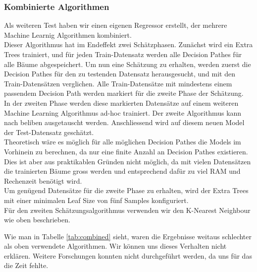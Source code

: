 \subsubsection{Kombinierte Algorithmen}
Als weiteren Test haben wir einen eigenen Regressor erstellt, der mehrere Machine Learnig Algorithmen kombiniert.\\[2ex]
%
Dieser Algorithmus hat im Endeffekt zwei Schätzphasen. Zunächst wird ein Extra Trees trainiert, und für jeden Train-Datensatz werden alle Decision Pathes für alle Bäume abgespeichert. Um nun eine Schätzung zu erhalten, werden zuerst die Decision Pathes für den zu testenden Datensatz herausgesucht, und mit den Train-Datensätzen verglichen. Alle Train-Datensätze mit mindestens einem passendem Decision Path werden markiert für die zweite Phase der Schätzung.\\
In der zweiten Phase werden diese markierten Datensätze auf einem weiteren Machine Learning Algorithmus ad-hoc trainiert. Der zweite Algorithmus kann nach beliben ausgetauscht werden. Anschliessend wird auf diesem neuen Model der Test-Datensatz geschätzt.\\
Theoretisch wäre es möglich für alle möglichen Decision Pathes die Models im Vorhinein zu berechnen, da nur eine finite Anzahl an Decision Pathes existieren. Dies ist aber aus praktikablen Gründen nicht möglich, da mit vielen Datensätzen die trainierten Bäume gross werden und entsprechend  dafür zu viel RAM und Rechenzeit benötigt wird.\\[2ex]
%
Um genügend Datensätze für die zweite Phase zu erhalten, wird der Extra Trees mit einer minimalen Leaf Size von fünf Samples konfiguriert.\\
Für den zweiten Schätzungsalgorithmus verwenden wir den K-Nearest Neighbour wie oben beschrieben.
%
\begin{table}[ht]
\centering
{}
\caption{Ergebnisse ohne ortsbezogenen Daten vom BFS}
\label{tab:combined}
\end{table}
%
Wie man in Tabelle \ref{tab:combined} sieht, waren die Ergebnisse weitaus schlechter als oben verwendete Algorithmen. Wir können uns dieses Verhalten nicht erklären. Weitere Forschungen konnten nicht durchgeführt werden, da uns für das die Zeit fehlte.\\[2ex]
